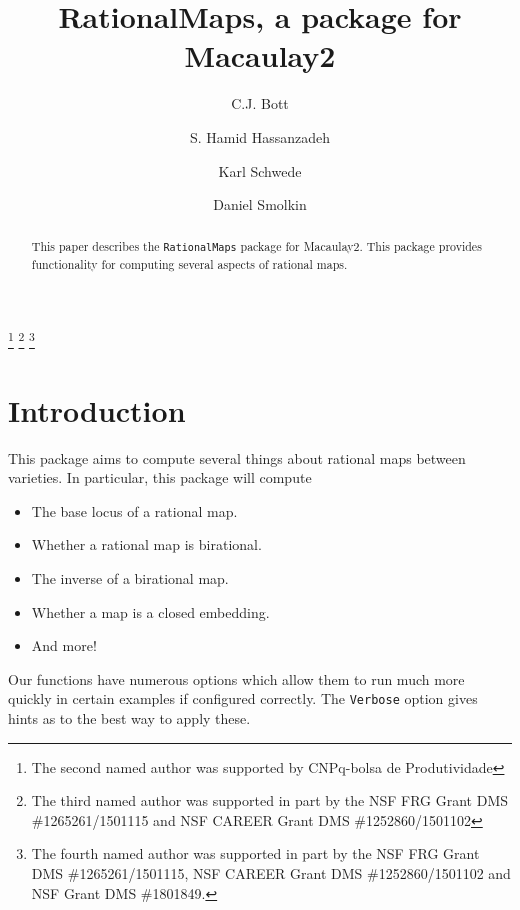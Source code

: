 \documentclass[11pt]{amsart}%
\numberwithin{equation}{theorem}
\renewcommand{\:}{\colon}
\theoremstyle{theorem}
\begin{document}
\title{RationalMaps, a package for Macaulay2}
\author{C.J. Bott}
\author{S. Hamid Hassanzadeh}
\author{Karl Schwede}
\author{Daniel Smolkin}
\address{Department of Mathematics\\Mailstop 3368\\Texas A\&M University\\College Station, TX 77843-3368}
\address{Department of Mathematics\\Federal University of Rio de Janeiro\\Brazil}
\address{Department of Mathematics\\ University of Utah\\ Salt Lake City\\ UT 84112}
\address{Department of Mathematics\\ University of Utah\\ Salt Lake City\\ UT 84112}

\thanks{The second named author was supported by CNPq-bolsa de Produtividade}
\thanks{The third named author was supported in part by the NSF FRG Grant DMS \#1265261/1501115 and NSF CAREER Grant DMS \#1252860/1501102}
\thanks{The fourth named author was supported in part by the NSF FRG Grant DMS \#1265261/1501115, NSF CAREER Grant DMS \#1252860/1501102 and NSF Grant DMS \#1801849.}


\begin{abstract}
This paper describes the {\tt RationalMaps} package for Macaulay2.  This package provides functionality for computing several aspects of rational maps.
\end{abstract}
\maketitle


\section{Introduction}


This package aims to compute several things about rational maps between varieties.  In particular, this package will compute
\begin{itemize}
\item{} The base locus of a rational map.
\item{} Whether a rational map is birational.
\item{} The inverse of a birational map.
\item{} Whether a map is a closed embedding.
\item{} And more!
\end{itemize}
Our functions have numerous options which allow them to run much more quickly in certain examples if configured correctly.  The {\tt Verbose} option gives hints as to the best way to apply these.
\end{document}
